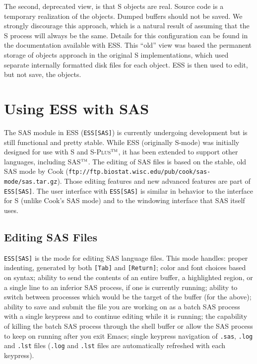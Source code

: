 \documentclass{article}
\newcommand*{\Splus}{\textsc{S-Plus}}
\newcommand{\tm}{$^{\mbox{\scriptsize\sc tm}}$}
\newenvironment{Salltt}{\small\begin{alltt}}{\end{alltt}}
\begin{document}
The second, deprecated view, is that S objects are real.  Source code
is a temporary realization of the objects.  Dumped buffers
should not be saved.  We strongly discourage this approach, which is a
natural result of assuming that the S process will always be the
same.  Details for this configuration can be found in the
documentation available with ESS.
This ``old'' view was based the permanent storage of objects approach
in the original S implementations, which used separate internally
formatted disk files for each object.  ESS is then used to edit, but
not save, the objects.


\section{Using ESS with SAS}
\label{sec:SAS}

The SAS module in ESS (\texttt{ESS[SAS]}) is currently undergoing
development but is still functional and pretty stable.  While ESS
(originally S-mode) was initially designed for use with S and \Splus\tm,
it has been extended to support other languages, including SAS\tm.  The
editing of SAS files is based on the stable, old SAS mode by Cook
(\texttt{ftp://ftp.biostat.wisc.edu/pub/cook/sas-mode/sas.tar.gz}).
Those editing features and new advanced features are part of
\texttt{ESS[SAS]}.  The user interface with \texttt{ESS[SAS]} is similar
in behavior to the interface for S (unlike Cook's SAS mode) and to the
windowing interface that SAS itself uses.

\subsection{Editing SAS Files}
\label{sec:SAS:edit}

\texttt{ESS[SAS]} is the mode for editing SAS language files.  This mode
handles: proper indenting, generated by both \texttt{[Tab]} and
\texttt{[Return]}; color and font choices based on syntax; ability to
send the contents of an entire buffer, a highlighted region, or a single
line to an inferior SAS process, if one is currently running; ability to
switch between processes which would be the target of the buffer (for
the above); ability to save and submit the file you are working on as a
batch SAS process with a single keypress and to continue editing while
it is running; the capability of killing the batch SAS process through
the shell buffer or allow the SAS process to keep on running after you
exit Emacs; single keypress navigation of \texttt{.sas}, \texttt{.log}
and \texttt{.lst} files (\texttt{.log} and \texttt{.lst} files are
automatically refreshed with each keypress).
\end{document}
